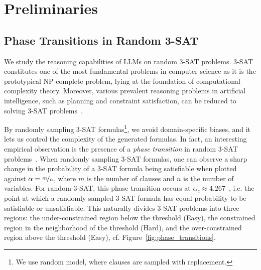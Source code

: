 \documentclass{article} %
\begin{document}

\section{Preliminaries}

\subsection{Phase Transitions in Random 3-SAT}
\label{section:3-sat}

We study the reasoning capabilities of LLMs on random 3-SAT problems.
3-SAT constitutes one of the most fundamental problems in computer science as it is the prototypical NP-complete problem, lying at the foundation of computational complexity theory.
Moreover, various prevalent reasoning problems in artificial intelligence, such as planning and constraint satisfaction, can be reduced to solving 3-SAT problems~\citep{garey_johnson}.

By randomly sampling 3-SAT formulas\footnote{We use \citet{selman1996generating} random model, where clauses are sampled with replacement.}, we avoid domain-specific biases, and it lets us control the complexity of the generated formulas.
In fact, an interesting empirical observation is the presence of a \emph{phase transition} in random 3-SAT problems~\citep{where_the_hard_problems_are}. When randomly sampling 3-SAT formulas, one can observe a sharp change in the probability of a 3-SAT formula being satisfiable when plotted against $\alpha = \nicefrac{m}{n}$, where $m$ is the number of clauses and $n$ is the number of variables. For random 3-SAT, this phase transition occurs at $\alpha_c \approx 4.267$~\citep{mertens2006threshold, ding2015proof}, i.e. the point at which a randomly sampled 3-SAT formula has equal probability to be satisfiable or unsatisfiable. This naturally divides 3-SAT problems into three regions: the under-constrained region below the threshold (Easy), the constrained region in the neighborhood of the threshold (Hard), and the over-constrained region above the threshold (Easy), cf. Figure~\ref{fig:phase_transitions}.
\end{document}
